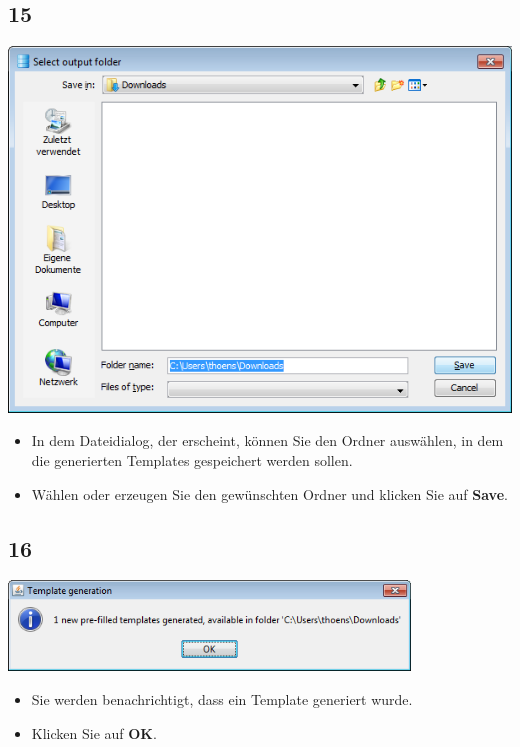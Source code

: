 \documentclass{beamer}
\begin{document}
\subsection{15}
\begin{frame}
	\begin{center}
  		\includegraphics[height=0.5\textheight]{15.png}
	\end{center}
	\begin{itemize}
		\item In dem Dateidialog, der erscheint, können Sie den Ordner auswählen, in dem die generierten Templates gespeichert werden sollen.
		\item Wählen oder erzeugen Sie den gewünschten Ordner und klicken Sie auf \textbf{Save}.
	\end{itemize}
\end{frame}

\subsection{16}
\begin{frame}
	\begin{center}
  		\includegraphics[width=0.8\textwidth]{16.png}
	\end{center}
	\begin{itemize}
		\item Sie werden benachrichtigt, dass ein Template generiert wurde.
		\item Klicken Sie auf \textbf{OK}.
	\end{itemize}
\end{frame}
\end{document}
